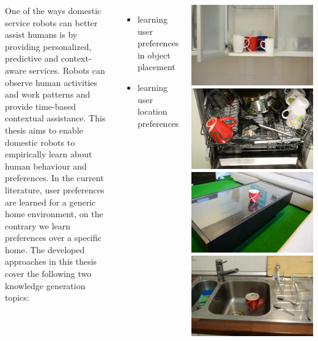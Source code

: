 \documentclass[25pt, 
               a0paper, 
               portraitmargin = 0mm, 
               margin = 0mm,
               innermargin = 50mm,
               blockverticalspace = 8mm,
               colspace = 40mm,
               subcolspace = 8mm]
               {tikzposter}
\begin{document}
\begin{columns}
   
    {
One of the ways domestic service robots can better assist humans is by providing
personalized, predictive and context-aware services. Robots can observe human
activities and work patterns and provide time-based contextual assistance. This
thesis aims to enable domestic robots to empirically learn about human behaviour
and preferences. In the current literature, user preferences are learned for a generic home environment, on the contrary we learn preferences over a specific home. The developed approaches in this thesis
cover the following two knowledge generation topics: 
\begin{itemize}
	\item learning user preferences in object placement
	\item learning user location preferences
\end{itemize}
        \begin{tikzfigure}
		    \includegraphics[width=0.243\linewidth]{images/cup/cup_cupboard.jpg}
		    \includegraphics[width=0.243\linewidth]{images/cup/cup_dishwasher.jpg}
		    \includegraphics[width=0.243\linewidth]{images/cup/cup_on_table.jpg}
		    \includegraphics[width=0.243\linewidth]{images/cup/cup_sink.jpg}
	    \end{tikzfigure}
    }
    

\end{columns}
\end{document}
